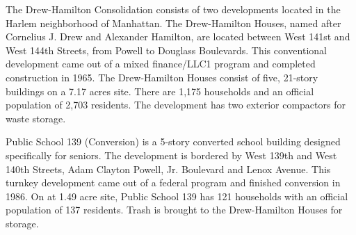 The Drew-Hamilton Consolidation consists of two developments located in the Harlem neighborhood of Manhattan. The Drew-Hamilton Houses, named after Cornelius J. Drew and Alexander Hamilton, are located between West 141st and West 144th Streets, from Powell to Douglass Boulevards. This conventional development came out of a mixed finance/LLC1 program and completed construction in 1965. The Drew-Hamilton Houses consist of five, 21-story buildings on a 7.17 acres site. There are 1,175 households and an official population of 2,703 residents. The development has two exterior compactors for waste storage.\par \vspace{.7\baselineskip}Public School 139 (Conversion) is a 5-story converted school building designed specifically for seniors. The development is bordered by West 139th and West 140th  Streets, Adam Clayton Powell, Jr. Boulevard and Lenox Avenue. This turnkey development came out of a federal program and finished conversion in 1986. On at 1.49 acre site, Public School 139 has 121 households with an official population of 137 residents. Trash is brought to the Drew-Hamilton Houses for storage.